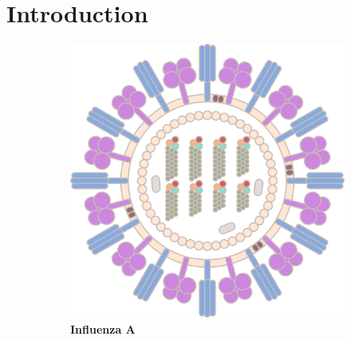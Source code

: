 \chapter{Introduction} \label{chap:1}

\begin{figure}
    \caption[A figure]{\textbf{A figure.} A figure.}
    \label{fig:1.0.1}
    
    \begin{adjustbox}{minipage=\dimexpr{}\fboxrule,fbox}
        \begin{subfigure}[b]{0.45\textwidth}
            \includegraphics[width=\textwidth]{Extra_Graphics/Influenza_A.pdf}
            \caption[Influenza A]{\textbf{Influenza A}}
            \label{fig:1.0.1a}
        \end{subfigure}
        \hfill
        \begin{subfigure}[b]{0.45\textwidth}

\end{subfigure}
\end{adjustbox}
\end{figure}
